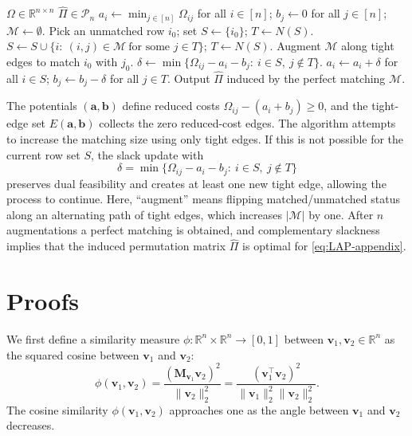 \documentclass[11pt, reqno]{amsart}
\newcommand{\R}{\mathbb{R}}
\renewcommand{\hat}{\widehat}
\renewcommand{\ge}{\geqslant}
\newcommand{\mP}{\mathcal{P}}
\newcommand{\1}{\mbox{1}\hspace{-0.25em}\mbox{l}}
\theoremstyle{definition}\newtheorem{problem}{Problem}[section]
\theoremstyle{definition}\newtheorem{definition}[problem]{Definition}
\theoremstyle{remark}\newtheorem{assumption}{Assumption}
\theoremstyle{remark}\newtheorem{remark}[problem]{Remark}
\theoremstyle{definition}\newtheorem{example}[problem]{Example}
\theoremstyle{plain}\newtheorem{theorem}[problem]{Theorem}
\theoremstyle{plain}\newtheorem{question}[problem]{Question}
\theoremstyle{plain}\newtheorem{lemma}[problem]{Lemma}
\theoremstyle{plain}\newtheorem{proposition}[problem]{Proposition}
\theoremstyle{plain}\newtheorem{corollary}[problem]{Corollary}
\theoremstyle{plain}\newtheorem{conjecture}[problem]{Conjecture}
\begin{document}
\begin{algorithm}[H]
\caption{Hungarian algorithm for $\min_{\Pi\in\mP_n}\langle \Omega,\Pi\rangle$}
\label{alg:scoring hungarian}
\begin{algorithmic}[1]
\REQUIRE $\Omega\in\R^{n\times n}$
\ENSURE $\hat{\Pi}\in\mP_n$
\STATE $a_i\leftarrow \min_{j\in[n]} \Omega_{ij}$ for all $i\in[n]$; \quad
       $b_j\leftarrow 0$ for all $j\in[n]$; \quad $\mathcal M\leftarrow\emptyset$.
  \STATE Pick an unmatched row $i_0$; set $S\leftarrow\{i_0\}$; $T\leftarrow N(S)$.
     \STATE $S\leftarrow S\cup\{i:\ (i,j)\in\mathcal M\ \text{for some }j\in T\}$;
            \quad $T\leftarrow N(S)$.
  \ENDWHILE
     \STATE Augment $\mathcal M$ along tight edges to match $i_0$ with $j_0$.
  \ELSE
     \STATE $\delta\leftarrow \min\{\Omega_{ij}-a_i-b_j:\ i\in S,\ j\notin T\}$.
     \STATE $a_i\leftarrow a_i+\delta$ for all $i\in S$; \quad $b_j\leftarrow b_j-\delta$ for all $j\in T$.
  \ENDIF
\ENDWHILE
\STATE Output $\hat{\Pi}$ induced by the perfect matching $\mathcal M$.
\end{algorithmic}
\end{algorithm}

The potentials $(\bm a,\bm b)$ define reduced costs $\Omega_{ij}-(a_i+b_j)\ge 0$,
and the tight-edge set $E(\bm a,\bm b)$ collects the zero reduced-cost edges.
The algorithm attempts to increase the matching size using only tight edges.
If this is not possible for the current row set $S$, the slack update with
\[
\delta=\min\{\Omega_{ij}-a_i-b_j:\ i\in S,\ j\notin T\}
\]
preserves dual feasibility and creates at least one new tight edge, allowing the process to continue.
Here, ``augment'' means flipping matched/unmatched status along an alternating path of tight edges,
which increases $|\mathcal M|$ by one. After $n$ augmentations a perfect matching is obtained, and
complementary slackness implies that the induced permutation matrix $\hat{\Pi}$ is optimal for
\eqref{eq:LAP-appendix}.

\section{Proofs}\label{sec:proofs}
We first define a similarity measure $\phi:\R^n \times \R^n \to [0,1]$ between $\bm{v}_1, \bm{v}_2 \in \R^n$ as the squared cosine between $\bm{v}_1$ and $\bm{v}_2$:
\begin{equation}
    \phi(\bm{v}_1, \bm{v}_2) = \frac{(\bm{M}_{\bm{v}_1}\bm{v}_2 )^2}{\|\bm{v}_2 \|^2_2} = \frac{(\bm{v}_1^\top\bm{v}_2 )^2}{\|\bm{v}_1\|^2_2 \|\bm{v}_2 \|^2_2}.
\end{equation}
The cosine similarity $\phi(\bm{v}_1, \bm{v}_2)$ approaches one as the angle between $\bm{v}_1$ and $\bm{v}_2$ decreases.
\end{document}
